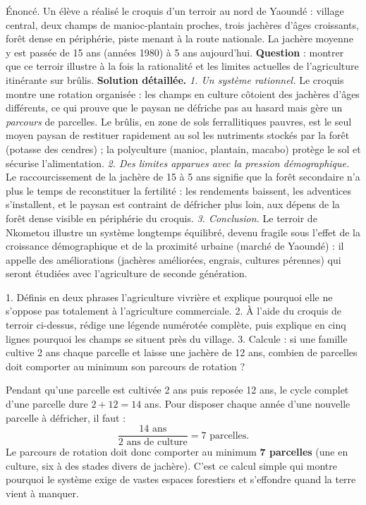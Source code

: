 \documentclass[11pt]{article}
\begin{document}
\begin{exoresolu}
Énoncé. Un élève a réalisé le croquis d'un terroir au nord de Yaoundé : village central, deux champs de manioc-plantain proches, trois jachères d'âges croissants, forêt dense en périphérie, piste menant à la route nationale. La jachère moyenne y est passée de 15 ans (années 1980) à 5 ans aujourd'hui. \textbf{Question} : montrer que ce terroir illustre à la fois la rationalité et les limites actuelles de l'agriculture itinérante sur brûlis.
\tcblower
\textbf{Solution détaillée.}
\emph{1. Un système rationnel.} Le croquis montre une rotation organisée : les champs en culture côtoient des jachères d'âges différents, ce qui prouve que le paysan ne défriche pas au hasard mais gère un \emph{parcours} de parcelles. Le brûlis, en zone de sols ferrallitiques pauvres, est le seul moyen paysan de restituer rapidement au sol les nutriments stockés par la forêt (potasse des cendres) ; la polyculture (manioc, plantain, macabo) protège le sol et sécurise l'alimentation.
\emph{2. Des limites apparues avec la pression démographique.} Le raccourcissement de la jachère de 15 à 5 ans signifie que la forêt secondaire n'a plus le temps de reconstituer la fertilité : les rendements baissent, les adventices s'installent, et le paysan est contraint de défricher plus loin, aux dépens de la forêt dense visible en périphérie du croquis.
\emph{3. Conclusion.} Le terroir de Nkometou illustre un système longtemps équilibré, devenu fragile sous l'effet de la croissance démographique et de la proximité urbaine (marché de Yaoundé) : il appelle des améliorations (jachères améliorées, engrais, cultures pérennes) qui seront étudiées avec l'agriculture de seconde génération.
\end{exoresolu}

\begin{exercice}
1. Définis en deux phrases l'agriculture vivrière et explique pourquoi elle ne s'oppose pas totalement à l'agriculture commerciale.
2. À l'aide du croquis de terroir ci-dessus, rédige une légende numérotée complète, puis explique en cinq lignes pourquoi les champs se situent près du village.
3. Calcule : si une famille cultive 2 ans chaque parcelle et laisse une jachère de 12 ans, combien de parcelles doit comporter au minimum son parcours de rotation ?
\end{exercice}

\begin{corrige}[Exercice n°3]
Pendant qu'une parcelle est cultivée 2 ans puis reposée 12 ans, le cycle complet d'une parcelle dure $2 + 12 = 14$ ans. Pour disposer chaque année d'une nouvelle parcelle à défricher, il faut :
\[ \frac{14 \text{ ans}}{2 \text{ ans de culture}} = 7 \text{ parcelles}. \]
Le parcours de rotation doit donc comporter au minimum \textbf{7 parcelles} (une en culture, six à des stades divers de jachère). C'est ce calcul simple qui montre pourquoi le système exige de vastes espaces forestiers et s'effondre quand la terre vient à manquer.
\end{corrige}
\end{document}
